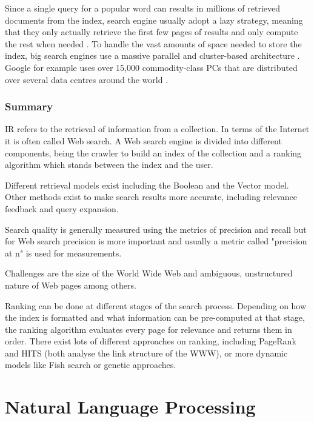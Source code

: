 Since a single query for a popular word can results in  millions of retrieved documents from the index, search engine usually adopt a lazy strategy, meaning that they only actually retrieve the first few pages of results and only compute the rest when needed \citep[p.459]{Baeza-Yates2011}. To handle the vast amounts of space needed to store the index, big search engines use a massive parallel and cluster-based architecture \citep[p.459]{Baeza-Yates2011}. Google for example uses over 15,000 commodity-class PCs that are distributed over several data centres around the world \citep{Dean2003}.

\subsubsection*{Summary}

IR refers to the retrieval of information from a collection. In terms of the Internet it is often called Web search. A Web search engine is divided into different components, being the crawler to build an index of the collection and a ranking algorithm which stands between the index and the user.

Different retrieval models exist including the Boolean and the Vector model. Other methods exist to make search results more accurate, including relevance feedback and query expansion.

Search quality is generally measured using the metrics of precision and recall but for Web search precision is more important and usually a metric called "precision at n" is used for measurements.

Challenges are the size of the World Wide Web and ambiguous, unstructured nature of Web pages among others.

Ranking can be done at different stages of the search process. Depending on how the index is formatted and what information can be pre-computed at that stage, the ranking algorithm evaluates every page for relevance and returns them in order. There exist lots of different approaches on ranking, including PageRank and HITS (both analyse the link structure of the WWW), or more dynamic models like Fish search or genetic approaches.

\section{Natural Language Processing}

\begin{comment}
  Damerau-Levensthein for clinamen!
\end{comment}

